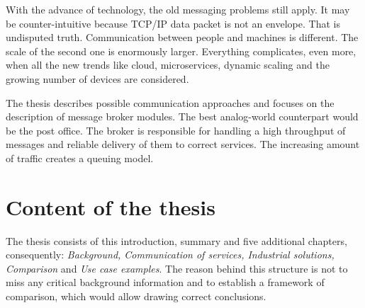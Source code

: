 With the advance of technology, the old messaging problems still apply. It may be counter-intuitive because TCP/IP data packet is not an envelope. That is undisputed truth. Communication between people and machines is different. The scale of the second one is enormously larger. Everything complicates, even more, when all the new trends like cloud, microservices, dynamic scaling and the growing number of devices are considered.

The thesis describes possible communication approaches and focuses on the description of message broker modules. The best analog-world counterpart would be the post office. The broker is responsible for handling a high throughput of messages and reliable delivery of them to correct services. The increasing amount of traffic creates a queuing model. 



\section{Content of the thesis}
\label{sec:content}

The thesis consists of this introduction, summary and five additional chapters, consequently: \textit{Background, Communication of services, Industrial solutions, Comparison} and \textit{Use case examples}. The reason behind this structure is not to miss any critical background information and to establish a framework of comparison, which would allow drawing correct conclusions. 
